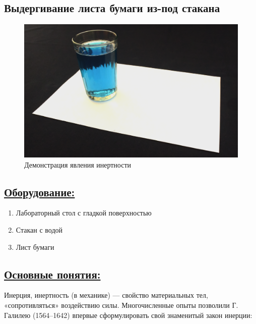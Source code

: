 \documentclass[14pt,a4paper,oneside]{extarticle}	%
\begin{document}

\begin{center}
	\section*{Выдергивание листа бумаги из-под стакана}
\end{center}

\begin{figure}[H] 	
	\centering 	
	\includegraphics[width=0.9\linewidth]{inertia-1.png}
	\caption{Демонстрация явления инертности}
\end{figure}

\subsection*{\underline{Оборудование:}}

\begin{enumerate}
\item Лабораторный стол с гладкой поверхностью
\item Стакан с водой
\item Лист бумаги
\end{enumerate}

\newpage
\subsection*{\underline{Основные понятия:}}

Инерция, инертность (в механике) — свойство материальных тел, «сопротивляться» воздействию силы.
Многочисленные опыты позволили Г. Галилею (1564–1642) впервые сформулировать свой знаменитый закон инерции:
\end{document}
